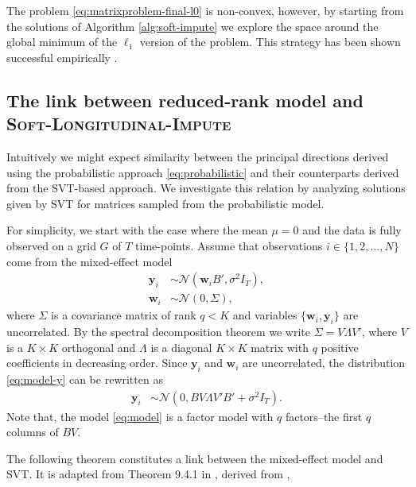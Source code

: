 \documentclass[preprint]{imsart}
\numberwithin{equation}{section}
\theoremstyle{plain}
\newcommand{\cN}{\mathcal{N}}
\newcommand{\by}{\mathbf{y}}
\newcommand{\bw}{\mathbf{w}}
\begin{document}
The problem \eqref{eq:matrixproblem-final-l0} is non-convex, however, by starting from the solutions of Algorithm \ref{alg:soft-impute} we explore the space around the global minimum of the $\ell_1$ version of the problem. This strategy has been shown successful empirically \citep{ge2016matrix}.


\subsection{The link between reduced-rank model and \textsc{Soft-Longitudinal-Impute}}\label{s:the-link}


Intuitively we might expect similarity between the principal directions derived using the probabilistic approach \eqref{eq:probabilistic} and their counterparts derived from the SVT-based approach. We investigate this relation by analyzing solutions given by SVT for matrices sampled from the probabilistic model.

For simplicity, we start with the case where the mean $\mu = 0$ and the data is fully observed on a grid $G$ of $T$ time-points. Assume that observations $i \in \{1,2,...,N\}$ come from the mixed-effect model
\begin{align}
  \by_i &\sim \cN(\bw_i B', \sigma^2 I_T), \label{eq:model-y}\\
  \bw_i &\sim \cN(0 , \Sigma), \label{eq:model-w}
\end{align}
%
where $\Sigma$ is a covariance matrix of rank $q < K$ and variables $\{\bw_i, \by_i\}$ are uncorrelated. By the spectral decomposition theorem we write $\Sigma = V\Lambda V'$, where $V$ is a $K\times K$ orthogonal and $\Lambda$ is a diagonal $K\times K$ matrix with $q$ positive coefficients in decreasing order.
Since $\by_i$ and $\bw_i$ are uncorrelated, the distribution \eqref{eq:model-y} can be rewritten as
\begin{align}
  \by_i &\sim \cN(0, B V \Lambda V'  B' + \sigma^2 I_T). \label{eq:model}
\end{align}
Note that, the model \eqref{eq:model} is a factor model with $q$ factors--the first $q$ columns of $BV$.

The following theorem constitutes a link between the mixed-effect model and SVT. It is adapted from Theorem 9.4.1 in \citet{mardia1980multivariate}, derived from \citet{joreskog1967some}, 
\end{document}
